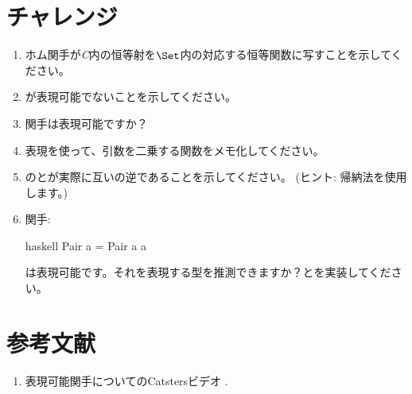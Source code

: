 \section{チャレンジ}

\begin{enumerate}
  \tightlist
  \item
        ホム関手が\emph{C}内の恒等射を$\Set$内の対応する恒等関数に写すことを示してください。
  \item
        が表現可能でないことを示してください。
  \item
        関手は表現可能ですか？
  \item
        表現を使って、引数を二乗する関数をメモ化してください。
  \item
        のとが実際に互いの逆であることを示してください。 (ヒント: 帰納法を使用します。) 
  \item
        関手: 

        \begin{snip}{haskell}
Pair a = Pair a a
\end{snip}
        は表現可能です。それを表現する型を推測できますか？とを実装してください。
\end{enumerate}

\section{参考文献}

\begin{enumerate}
  \tightlist
  \item
        表現可能関手についてのCatstersビデオ
        .
\end{enumerate}
